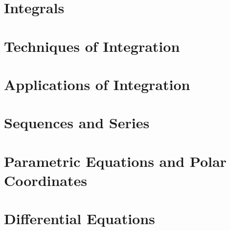 \documentclass[12pt]{article}
\begin{document}
\section{Integrals}





\newpage
\section{Techniques of Integration}





\section{Applications of Integration}




\section{Sequences and Series}






\section{Parametric Equations and Polar Coordinates}



\section{Differential Equations}



\end{document}
